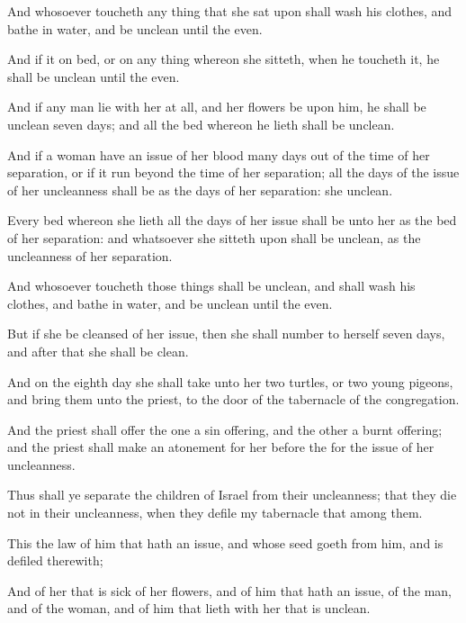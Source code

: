 {And whosoever
toucheth any
thing that she
sat upon shall
wash his
clothes, and
bathe
{} in
water, and be
unclean until the
even.

And if it
{} on
{}
bed, or on any
thing whereon she
sitteth, when he
toucheth it, he shall be
unclean until the
even.

And if any
man
lie with her at
all, and her
flowers be upon him, he shall be
unclean
seven
days; and all the
bed whereon he
lieth shall be
unclean.

And if a
woman
have an
issue of her
blood
many
days
out of the
time of her
separation, or if it
run beyond the
time of her
separation; all the
days of the
issue of her
uncleanness shall be as the
days of her
separation: she
{}
unclean.

Every
bed whereon she
lieth all the
days of her
issue shall be unto her as the
bed of her
separation: and
whatsoever she
sitteth upon shall be
unclean, as the
uncleanness of her
separation.

And whosoever
toucheth those things shall be
unclean, and shall
wash his
clothes, and
bathe
{} in
water, and be
unclean until the
even.

But if she be
cleansed of her
issue, then she shall
number to herself
seven
days, and
after that she shall be
clean.

And on the
eighth
day she shall
take unto her
two
turtles, or
two
young
pigeons, and
bring them unto the
priest, to the
door of the
tabernacle of the
congregation.

And the
priest shall
offer the
one
{} a sin
offering, and the
other
{} a burnt
offering; and the
priest shall make an
atonement for her
before the
{} for the
issue of her
uncleanness.

Thus shall ye
separate the
children of
Israel from their
uncleanness; that they
die not in their
uncleanness, when they
defile my
tabernacle that
{}
among them.

This
{} the
law of him that hath an
issue, and
{} whose
seed
goeth from him, and is
defiled therewith;

And of her that is
sick of her
flowers, and of him that
hath an
issue, of the
man, and of the
woman, and of
him that
lieth with her that is
unclean.




\par }
